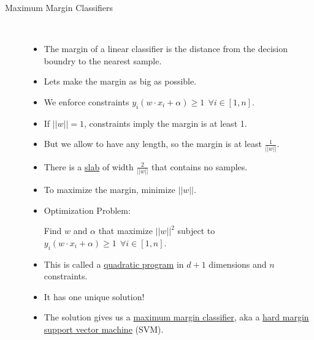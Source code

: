 \documentclass[10pt]{article}
\begin{document}
\begin{description}
	\item[Maximum Margin Classifiers]
		\
		\begin{itemize}
			\item The margin of a linear classifier is the distance from the decision boundry to the nearest sample.
			\item Lets make the margin as big as possible.
				\begin{center}
				\end{center}
			\item We enforce constraints $y_{i}(w \cdot x_{i} + \alpha) \geq 1 \ \ \forall i \in [1, n]$.
			\item If $||w|| = 1$, constraints imply the margin is at least 1.
			\item But we allow to have any length, so the margin is at least $\frac{1}{||w||}$.
			\item There is a \underline{slab} of width $\frac{2}{||w||}$ that contains no samples.
			\item To maximize the margin, minimize $||w||$.
			\item Optimization Problem:
				\begin{center}
					Find $w$ and $\alpha$ that maximize $||w||^{2}$ subject to $y_{i}(w \cdot x_{i} + \alpha) \geq 1 \ \ \forall i \in [1, n]$.
				\end{center}
			\item This is called a \underline{quadratic program} in $d+1$ dimensions and $n$ constraints.
			\item It has one unique solution!
			\item The solution gives us a \underline{maximum margin classifier}, aka a \underline{hard margin support vector machine} (SVM).
		\end{itemize}
\end{description}

\newpage
\end{document}
